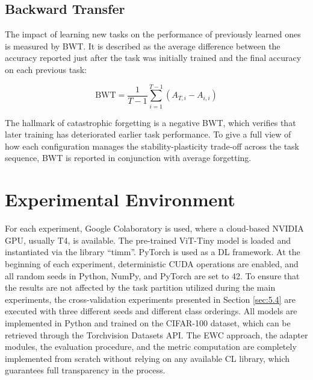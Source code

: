 \documentclass[english, LaM, oneside]{sapthesis}%
\numberwithin{equation}{chapter}
\begin{document}
\subsection{Backward Transfer}
The impact of learning new tasks on the performance of previously learned ones is measured by BWT. It is described as the average difference between the accuracy reported just after the task was initially trained and the final accuracy on each previous task:

\begin{equation}
    \text{BWT} = \frac{1}{T-1} \sum_{i=1}^{T-1} \left( A_{T,i} - A_{i,i} \right)
\end{equation}
 
The hallmark of catastrophic forgetting is a negative BWT, which verifies that later training has deteriorated earlier task performance. To give a full view of how each configuration manages the stability-plasticity trade-off across the task sequence, BWT is reported in conjunction with average forgetting.

\section{Experimental Environment}
\label{sec:4.6}
For each experiment, Google Colaboratory is used, where a cloud-based NVIDIA GPU, usually T4, is available. The pre-trained ViT-Tiny model is loaded and instantiated via the library \enquote{timm}\cite{31}. PyTorch is used as a DL framework\cite{39}. At the beginning of each experiment, deterministic CUDA operations are enabled, and all random seeds in Python, NumPy, and PyTorch are set to 42. To ensure that the results are not affected by the task partition utilized during the main experiments, the cross-validation experiments presented in Section \ref{sec:5.4} are executed with three different seeds and different class orderings.
All models are implemented in Python and trained on the CIFAR-100 dataset, which can be retrieved through the Torchvision Datasets API. The EWC approach, the adapter modules, the evaluation procedure, and the metric computation are completely implemented from scratch without relying on any available CL library, which guarantees full transparency in the process.
\end{document}
